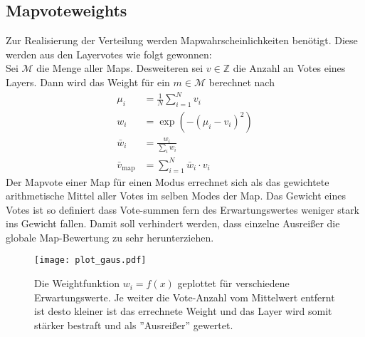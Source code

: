     \subsection{Mapvoteweights}
        Zur Realisierung der Verteilung werden Mapwahrscheinlichkeiten benötigt. 
        Diese werden aus den Layervotes wie folgt gewonnen:\\
        Sei $\mathcal{M}$ die Menge aller Maps. 
        Desweiteren sei $v\in\mathbb{Z}$ die Anzahl an Votes eines Layers.
        Dann wird das Weight für ein $m\in \mathcal{M}$ berechnet nach 
        \begin{align*}
            \mu_i &= \frac{1}{N}\sum_{i=1}^N v_i\\
            w_i &= \exp\left(-(\mu_i-v_i)^2\right)\\
            \bar{w}_i &= \frac{w_i}{\sum_i w_i}\\
            \bar{v}_\text{map} &= \sum_{i=1}^N\bar{w}_i\cdot v_i
        \end{align*}
        Der Mapvote einer Map für einen Modus errechnet sich als das gewichtete arithmetische Mittel aller Votes im selben Modes der Map.
        Das Gewicht eines Votes ist so definiert dass Vote-summen fern des Erwartungswertes weniger stark ins Gewicht fallen.
        Damit soll verhindert werden, dass einzelne \glqq{}Ausreißer\grqq{} die globale Map-Bewertung zu sehr herunterziehen.
        \begin{figure}[htbp]
            \centering
            \texttt{[image: plot\_gaus.pdf]}
            \caption{Die Weightfunktion $w_i=f(x)$ geplottet für verschiedene Erwartungswerte.
            Je weiter die Vote-Anzahl vom Mittelwert entfernt ist desto kleiner ist das errechnete Weight und das Layer wird somit stärker bestraft und als ''Ausreißer'' gewertet.}
        \end{figure}
